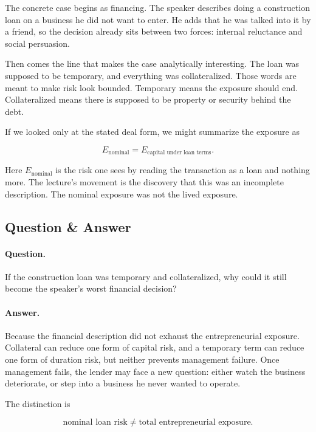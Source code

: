 The concrete case begins as financing. The speaker describes doing a construction loan on a business he did not want to enter. He adds that he was talked into it by a friend, so the decision already sits between two forces: internal reluctance and social persuasion.

Then comes the line that makes the case analytically interesting. The loan was supposed to be temporary, and everything was collateralized. Those words are meant to make risk look bounded. Temporary means the exposure should end. Collateralized means there is supposed to be property or security behind the debt.

If we looked only at the stated deal form, we might summarize the exposure as

\begin{equation}
E_{\text{nominal}}
=
E_{\text{capital under loan terms}}.
\end{equation}

Here \(E_{\text{nominal}}\) is the risk one sees by reading the transaction as a loan and nothing more. The lecture's movement is the discovery that this was an incomplete description. The nominal exposure was not the lived exposure.

\subsection{Question \& Answer}

\paragraph{Question.}
If the construction loan was temporary and collateralized, why could it still become the speaker's worst financial decision?

\paragraph{Answer.}
Because the financial description did not exhaust the entrepreneurial exposure. Collateral can reduce one form of capital risk, and a temporary term can reduce one form of duration risk, but neither prevents management failure. Once management fails, the lender may face a new question: either watch the business deteriorate, or step into a business he never wanted to operate.

The distinction is

\begin{equation}
\text{nominal loan risk}
\neq
\text{total entrepreneurial exposure}.
\end{equation}

